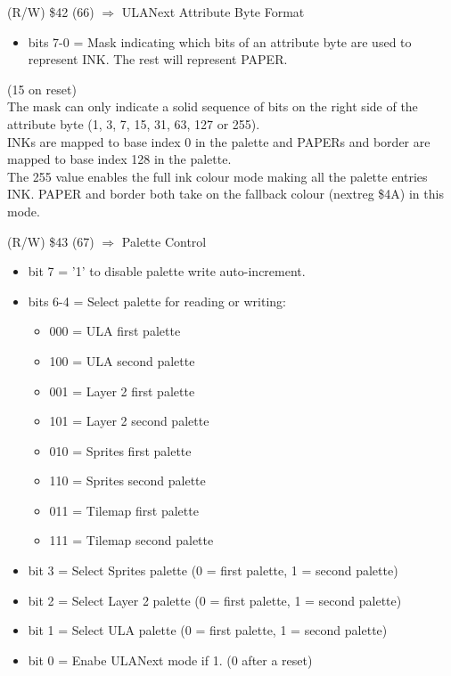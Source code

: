 (R/W) \$42 (66) $\Rightarrow$ ULANext Attribute Byte Format
\begin{itemize}
\item[] bits 7-0 = Mask indicating which bits of an attribute byte are
  used to represent INK. The rest will represent PAPER.
\end{itemize}
(15 on reset)\\
The mask can only indicate a solid sequence of bits on the right side
of the attribute byte (1, 3, 7, 15, 31, 63, 127 or 255).\\
INKs are mapped to base index 0 in the palette and PAPERs and border
are mapped to base index 128 in the palette.\\
The 255 value enables the full ink colour mode making all the palette
entries INK. PAPER and border both take on the fallback colour
(nextreg \$4A) in this mode.

(R/W) \$43 (67) $\Rightarrow$ Palette Control
\begin{itemize}
\item[] bit 7 = '1' to disable palette write auto-increment.
\item[] bits 6-4 = Select palette for reading or writing:
  \begin{itemize}
  \item[] 000 = ULA first palette
  \item[] 100 = ULA second palette
  \item[] 001 = Layer 2 first palette
  \item[] 101 = Layer 2 second palette
  \item[] 010 = Sprites first palette
  \item[] 110 = Sprites second palette
  \item[] 011 = Tilemap first palette
  \item[] 111 = Tilemap second palette
  \end{itemize}
\item[] bit 3 = Select Sprites palette (0 = first palette, 1 = second palette)
\item[] bit 2 = Select Layer 2 palette (0 = first palette, 1 = second palette)
\item[] bit 1 = Select ULA palette (0 = first palette, 1 = second palette)
\item[] bit 0 = Enabe ULANext mode if 1. (0 after a reset)
\end{itemize}


